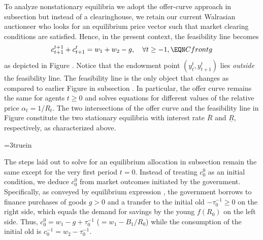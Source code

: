 To analyze nonstationary equilibria we adopt the offer-curve 
approach in subsection  but instead of
a clearinghouse, we retain our current Walrasian auctioneer
who looks for an equilibrium price vector such that market 
clearing conditions  are satisfied. Hence, in the
present context, the feasibility line 
becomes
$$c_{t+1}^{t+1} + c_{t+1}^t 
     = w_1 + w_2 -g , \quad \forall t \geq -1,   \EQN Cfrontg
$$
as depicted in Figure . Notice that the endowment point 
$(y^t_t, y^t_{t+1})$ lies {\it outside} the feasibility line.
The feasibility line 
is the only object that changes as compared to earlier 
Figure  in subsection . In 
particular, the offer curve remains the same for agents $t\geq 0$ 
and solves equations  for different values of
the relative price $\alpha_t = 1/ R_t$. The two intersections
of the offer curve and the feasibility line in 
Figure  constitute the two stationary equilibria 
with interest rate $\overline R$ and $\underline R$, respectively,
as characterized above.


\centerline{\epsfxsize=3truein}
\caption{Equilibria with debt- or money-financed government deficit finance.}
\endfigure

The steps laid out to solve for an equilibrium
allocation in subsection  remain
the same except for the very first period $t=0$.
Instead of treating $c^0_0$ as an initial condition,
we deduce $c^0_0$ from market outcomes initiated
by the government. Specifically, as conveyed by  
equilibrium expression ,  
the government borrows to finance purchases of 
goods $g>0$ and a transfer to the initial old  
$-\tau^{-1}_0\geq 0$ on the right side, which equals
the demand for savings by the young $f(R_0)$
on the left side. Thus, 
$c^0_0 = w_1 -g + \tau^{-1}_0$ ($=w_1 - B_1/R_0$)
while the consumption of the initial old
is $c^{-1}_0 = w_2 - \tau^{-1}_0$.

